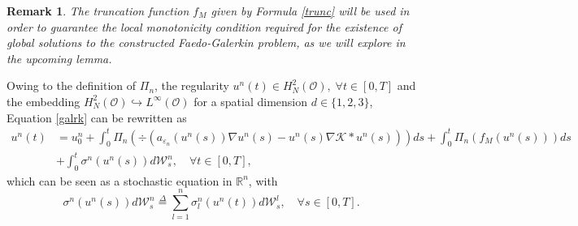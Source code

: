 \documentclass[10pt,number,preprint,times]{elsarticle}
\numberwithin{equation}{section} %
\newtheorem{rem}{Remark}[section]
\begin{document}
\begin{rem}
The truncation function $f_M$ given by Formula \eqref{trunc} will be used in order to guarantee the local monotonicity condition required for the existence of global solutions to the constructed Faedo-Galerkin problem, as we will explore in the upcoming lemma. 
\end{rem}
\noindent
Owing to the definition of $\Pi_n$, the regularity $u^n(t) \in H^2_N(\mathcal{O}),\; \forall t \in [0,T]$ and the embedding $H^2_N(\mathcal{O}) \hookrightarrow L^\infty(\mathcal{O})$ for a spatial dimension $d\in \{1,2,3\}$, Equation \eqref{galrk} can be rewritten as
\begin{equation}\label{galrkmod}
	\begin{split}
	u^n(t)&=u^n_0+\int_0^t \Pi_n\left( \div\left(a_{\varepsilon_n}(u^n(s)) \nabla u^n(s)-u^n(s)\nabla \mathcal{K} \ast u^n(s)\right)\right)ds+\int_0^t\Pi_n\left( f_M(u^n(s))\right)ds\\
	&+\int_{0}^t \sigma^n(u^n(s))   d\mathcal{W}^n_s, \quad \forall t \in [0,T],
	\end{split}
\end{equation}
which can be seen as a stochastic equation in $\mathbb{R}^n$, with $$\sigma^n(u^n(s))   d\mathcal{W}^n_s\overset{\Delta}{=}\sum_{l=1}^n \sigma^n_l(u^n(t)) d\mathcal{W}^l_s, \quad \forall s \in [0,T].$$
\end{document}
